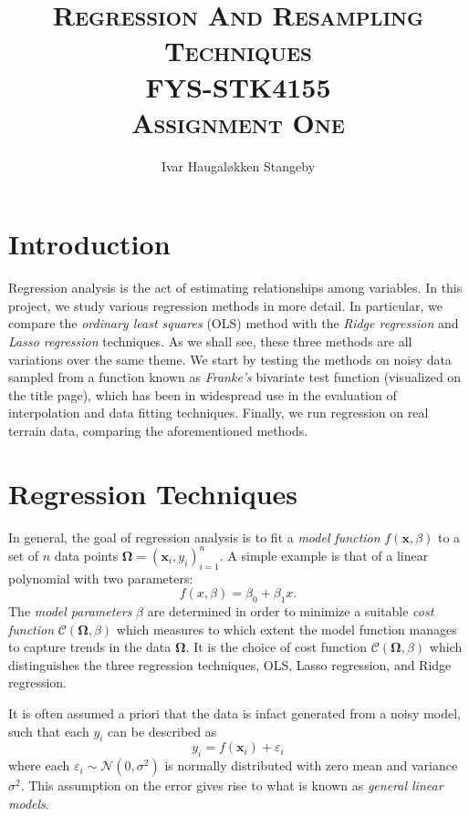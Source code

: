 \documentclass[dvipsnames, article, a4paper, oneside, 12pt]{memoir}
\title{\textsc{Regression And Resampling Techniques \\
  FYS-STK4155 \\
Assignment One}}
\author{Ivar Haugal{\o}kken Stangeby}
\newcommand{\x}{\bm{x}}
\newcommand{\data}{\bm{\Omega}}
\newcommand{\cost}{\mathcal{C}}
\newcommand{\N}{\mathcal{N}}
\begin{document}
  \maketitle 
  
  \tableofcontents

  \chapter{Introduction}
   
  Regression analysis is the act of estimating relationships among variables.
  In this project, we study various regression methods in more detail. In
  particular, we compare the \emph{ordinary least squares} (OLS) method with
  the \emph{Ridge regression} and \emph{Lasso regression} techniques. As we
  shall see, these three methods are all variations over the same theme. We
  start by testing the methods on noisy data sampled from a function known as
  \emph{Franke's} bivariate test function (visualized on the title page), which
  has been in widespread use in the evaluation of interpolation and data
  fitting techniques. Finally, we run regression on real terrain data,
  comparing the aforementioned methods.

  \chapter{Regression Techniques}

  In general, the goal of regression analysis is to fit a \emph{model function}
  \( f(\x, \beta) \) to a set of \( n \) data points \( \data = (\x_i,
  y_i)_{i=1}^n \). A simple example is that of a linear polynomial with two
  parameters:
  \begin{equation}
    f(x, \beta) = \beta_0 + \beta_1 x.
  \end{equation}
  The \emph{model parameters} \( \beta \) are determined in order to minimize a
  suitable \emph{cost function} \(\cost(\data, \beta)\) which measures to which
  extent the model function manages to capture trends in the data \( \data \).
  It is the choice of cost function \( \mathcal{C}(\data, \beta)\) which
  distinguishes  the three regression techniques, OLS, Lasso regression, and
  Ridge regression.

  \begin{assumption}
    \label{as:general_linear}
    It is often assumed a priori that the data is infact generated from a noisy
    model, such that each \( y_i \) can be described as
    \begin{equation}
      y_i = f(\x_i) + \varepsilon_i
    \end{equation}
    where each \( \varepsilon_i \sim \N(0, \sigma^2) \) is normally distributed
    with zero mean and variance \( \sigma^2 \). This assumption on the error
    gives rise to what is known as \emph{general linear models}.
  \end{assumption}
\end{document}
